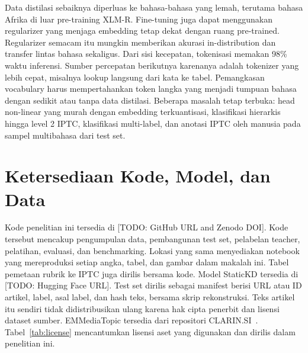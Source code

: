 \documentclass[journal]{IEEEtran}
\DeclareRobustCommand{\todo}[1]{{\color{red}[TODO: #1]}}
\begin{document}
Data distilasi sebaiknya diperluas ke bahasa-bahasa yang lemah, terutama bahasa Afrika di luar pre-training XLM-R. Fine-tuning juga dapat menggunakan regularizer yang menjaga embedding tetap dekat dengan ruang pre-trained. Regularizer semacam itu mungkin memberikan akurasi in-distribution dan transfer lintas bahasa sekaligus. Dari sisi kecepatan, tokenisasi memakan 98\% waktu inferensi. Sumber percepatan berikutnya karenanya adalah tokenizer yang lebih cepat, misalnya lookup langsung dari kata ke tabel. Pemangkasan vocabulary harus mempertahankan token langka yang menjadi tumpuan bahasa dengan sedikit atau tanpa data distilasi. Beberapa masalah tetap terbuka: head non-linear yang murah dengan embedding terkuantisasi, klasifikasi hierarkis hingga level 2 IPTC, klasifikasi multi-label, dan anotasi IPTC oleh manusia pada sampel multibahasa dari test set.

\section*{Ketersediaan Kode, Model, dan Data}
Kode penelitian ini tersedia di \todo{GitHub URL and Zenodo DOI}. Kode tersebut mencakup pengumpulan data, pembangunan test set, pelabelan teacher, pelatihan, evaluasi, dan benchmarking. Lokasi yang sama menyediakan notebook yang mereproduksi setiap angka, tabel, dan gambar dalam makalah ini. Tabel pemetaan rubrik ke IPTC juga dirilis bersama kode. Model StaticKD tersedia di \todo{Hugging Face URL}. Test set dirilis sebagai manifest berisi URL atau ID artikel, label, asal label, dan hash teks, bersama skrip rekonstruksi. Teks artikel itu sendiri tidak didistribusikan ulang karena hak cipta penerbit dan lisensi dataset sumber. EMMediaTopic tersedia dari repositori CLARIN.SI~\cite{emmediatopic2025}. Tabel~\ref{tab:license} mencantumkan lisensi aset yang digunakan dan dirilis dalam penelitian ini.
\end{document}
